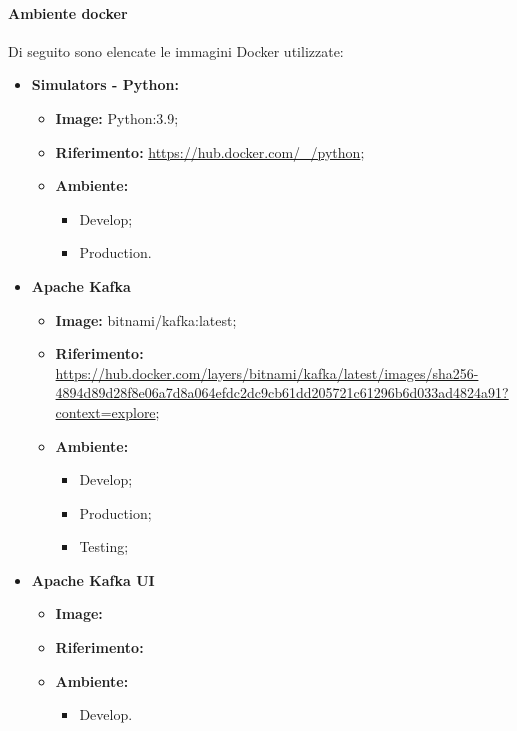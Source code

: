\paragraph*{Ambiente docker}

Di seguito sono elencate le immagini Docker utilizzate:

\begin{itemize}

  \item \textbf{Simulators - Python:} 
    \begin{itemize}
      \item \textbf{Image:} Python:3.9;
      \item \textbf{Riferimento:} \url{https://hub.docker.com/_/python};
      \item \textbf{Ambiente:}
        \begin{itemize}
          \item Develop;
          \item Production.
        \end{itemize}
    \end{itemize}

  \item \textbf{Apache Kafka} 
    \begin{itemize}
      \item \textbf{Image:} bitnami/kafka:latest;
      \item \textbf{Riferimento:} \url{https://hub.docker.com/layers/bitnami/kafka/latest/images/sha256-4894d89d28f8e06a7d8a064efdc2dc9cb61dd205721c61296b6d033ad4824a91?context=explore};
      \item \textbf{Ambiente:}
        \begin{itemize}
          \item Develop;
          \item Production;
          \item Testing;
        \end{itemize}
    \end{itemize}

  \item \textbf{Apache Kafka UI} 
    \begin{itemize}
      \item \textbf{Image:}
      \item \textbf{Riferimento:}
      \item \textbf{Ambiente:}
        \begin{itemize}
          \item Develop.
        \end{itemize}
    \end{itemize}


\end{itemize}
